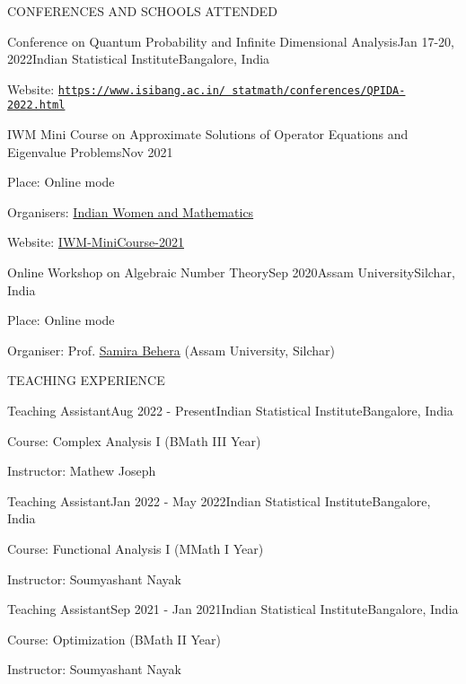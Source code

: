 \documentclass{resume} %
\newcommand{\weblink}[1]{\texttt{\href{#1}{#1}}}
\begin{document}
\begin{rSection}{CONFERENCES AND SCHOOLS ATTENDED}
\begin{rSubsection}{Conference on Quantum Probability and Infinite Dimensional Analysis}{Jan 17-20, 2022}{Indian Statistical Institute}{Bangalore, India}
		\item Website: \weblink{https://www.isibang.ac.in/~statmath/conferences/QPIDA-2022.html}
	\end{rSubsection}

	\begin{rSubsection}{IWM Mini Course on Approximate Solutions of Operator Equations and Eigenvalue Problems}{Nov 2021}{}{}
		\item Place: Online mode
		\item Organisers: \href{https://sites.google.com/site/iwmmath/}{Indian Women and Mathematics}
		
		\item Website: \href{https://drive.google.com/file/d/1FYd-6j_hwOMfc2Z9NIQiv2ZqSnF859J4/view}{IWM-MiniCourse-2021}
	\end{rSubsection}

	\begin{rSubsection}{Online Workshop on Algebraic Number Theory}{Sep 2020}{Assam University}{Silchar, India}
		\item Place: Online mode
		\item Organiser: Prof. \href{sbsap.aus@gmail.com}{Samira Behera} (Assam University, Silchar)
	\end{rSubsection}

	
\end{rSection}

\begin{rSection}{TEACHING EXPERIENCE}
	
	\begin{rSubsection}{Teaching Assistant}{Aug 2022 - Present}{Indian Statistical Institute}{Bangalore, India}
		\item Course: Complex Analysis I (BMath III Year)
		\item Instructor: Mathew Joseph
	\end{rSubsection}

	\begin{rSubsection}{Teaching Assistant}{Jan 2022 - May 2022}{Indian Statistical Institute}{Bangalore, India}
		\item Course: Functional Analysis I (MMath I Year)
		\item Instructor: Soumyashant Nayak
	\end{rSubsection}
	
	\begin{rSubsection}{Teaching Assistant}{Sep 2021 - Jan 2021}{Indian Statistical Institute}{Bangalore, India}
		\item Course: Optimization (BMath II Year)
		\item Instructor: Soumyashant Nayak
	\end{rSubsection}

\end{rSection}
\end{document}
